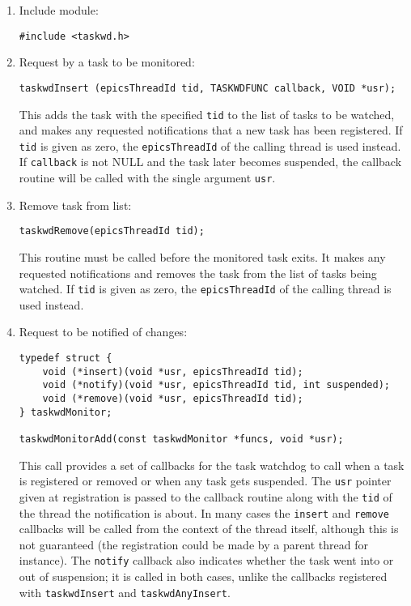 \begin{enumerate}

\item Include module:

\begin{verbatim}
#include <taskwd.h>
\end{verbatim}

\item Request by a task to be monitored:

\begin{verbatim}
taskwdInsert (epicsThreadId tid, TASKWDFUNC callback, VOID *usr);
\end{verbatim}
This adds the task with the specified \verb|tid| to the list of tasks to be watched, and makes any requested notifications 
that a new task has been registered. If \verb|tid| is given as zero, the \verb|epicsThreadId| of the calling thread is used 
instead. If \verb|callback| is not NULL and the task later becomes suspended, the callback routine will be called with 
the single argument \verb|usr|.

\item Remove task from list:

\begin{verbatim}
taskwdRemove(epicsThreadId tid);
\end{verbatim}

This routine must be called before the monitored task exits. It makes any requested notifications and removes the 
task from the list of tasks being watched. If \verb|tid| is given as zero, the \verb|epicsThreadId| of the calling thread is 
used instead.

\item Request to be notified of changes:

\begin{verbatim}
typedef struct {
    void (*insert)(void *usr, epicsThreadId tid);
    void (*notify)(void *usr, epicsThreadId tid, int suspended);
    void (*remove)(void *usr, epicsThreadId tid);
} taskwdMonitor;

taskwdMonitorAdd(const taskwdMonitor *funcs, void *usr);
\end{verbatim}

This call provides a set of callbacks for the task watchdog to call when a task is registered or removed or when any 
task gets suspended. The \verb|usr| pointer given at registration is passed to the callback routine along with the \verb|tid| of 
the thread the notification is about. In many cases the \verb|insert| and \verb|remove| callbacks will be called from the 
context of the thread itself, although this is not guaranteed (the registration could be made by a parent thread for 
instance). The \verb|notify| callback also indicates whether the task went into or out of suspension; it is called in both 
cases, unlike the callbacks registered with \verb|taskwdInsert| and \verb|taskwdAnyInsert|.


\end{enumerate}
